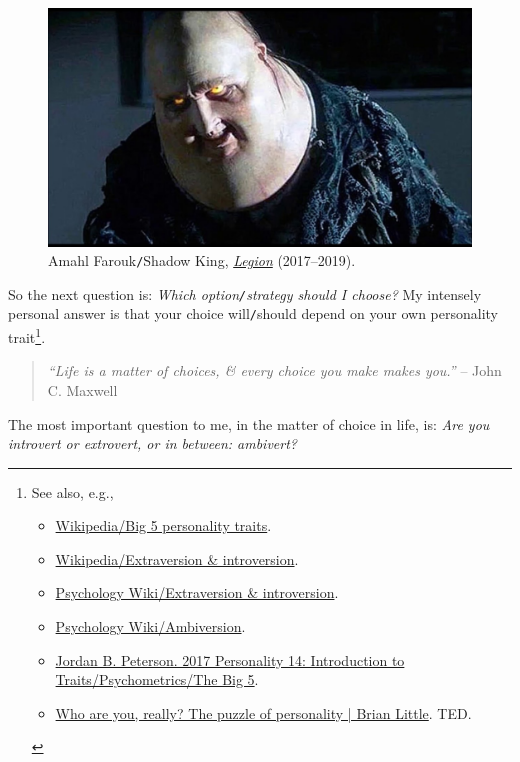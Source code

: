 \documentclass[12pt,twoside]{book}
\begin{document}
\begin{figure}[H]
	\centering
	\includegraphics[width = 12cm]{Shadow_King}
	\caption{{\sf Amahl Farouk{\tt/}Shadow King}, \href{https://www.imdb.com/title/tt5114356}{\it Legion} (2017--2019).}
	\label{fig3}
\end{figure}
So the next question is: {\it Which option{\tt/}strategy should I choose?} My intensely personal answer is that your choice will{\tt/}should depend on your own personality trait\footnote{See also, e.g.,
	\begin{itemize}
		\item \href{https://en.wikipedia.org/wiki/Big_Five_personality_traits}{Wikipedia/Big 5 personality traits}.
		\item \href{https://en.wikipedia.org/wiki/Extraversion_and_introversion}{Wikipedia/Extraversion \& introversion}.
		\item \href{https://psychology.wikia.org/wiki/Extraversion_and_introversion}{Psychology Wiki/Extraversion \& introversion}.
		\item \href{https://psychology.wikia.org/wiki/Ambiversion}{Psychology Wiki/Ambiversion}.
		\item \href{https://www.youtube.com/watch?v=pCceO_D4AlY}{Jordan B. Peterson. 2017 Personality 14: Introduction to Traits/Psychometrics/The Big 5}.
		\item \href{https://www.youtube.com/watch?v=qYvXk_bqlBk}{Who are you, really? The puzzle of personality | Brian Little}. TED.
\end{itemize}}.
\begin{quotation}
	{\it``Life is a matter of choices, \& every choice you make makes you.''} -- {\sc John C. Maxwell}
\end{quotation}
The most important question to me, in the matter of choice in life, is: {\it Are you introvert or extrovert, or in between: ambivert?}
\end{document}
